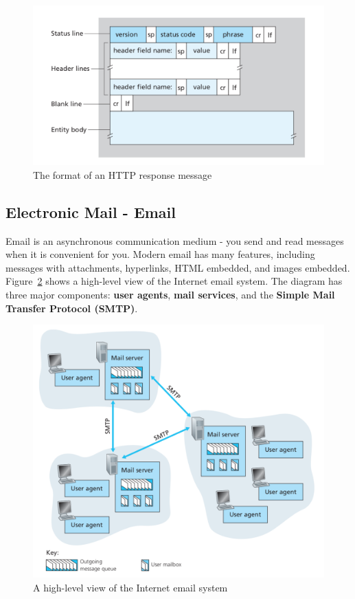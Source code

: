 \documentclass[a4paper, 11pt]{article}
\begin{document}
\begin{figure}[h]
\includegraphics[scale=0.7]{http-response-format.png}
\caption{The format of an HTTP response message}
\label{fig:http-response-format}
\end{figure}

\subsection{Electronic Mail - Email}
Email is an asynchronous communication medium - you send and read messages when it is convenient for you. Modern email has many features, including messages with attachments, hyperlinks, HTML embedded, and images embedded. Figure~\ref{fig:email-system} shows a high-level view of the Internet email system. The diagram has three major components: \textbf{user agents}, \textbf{mail services}, and the \textbf{Simple Mail Transfer Protocol (SMTP)}.\\

\begin{figure}[h]
\includegraphics[scale=0.6]{email-system.png}
\caption{A high-level view of the Internet email system}
\label{fig:email-system}
\end{figure}
\end{document}
